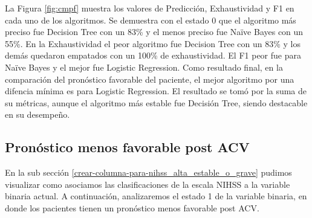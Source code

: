     La Figura \ref{fig:cmpf} muestra los valores de Predicción, Exhaustividad y F1 en cada uno de los algoritmos. Se demuestra con el estado 0 que el algoritmo más preciso fue Decision Tree con un 83\% y el menos preciso fue Naïve Bayes con un 55\%. En la Exhaustividad el peor algoritmo fue Decision Tree con un 83\% y los demás quedaron empatados con un 100\% de exhaustividad. El F1 peor fue para Naïve Bayes y el mejor fue Logistic Regression.
    Como resultado final, en la comparación del pronóstico favorable del paciente, el mejor algoritmo por una difencia mínima es para Logistic Regression. El resultado se tomó por la suma de su métricas, aunque el algoritmo más estable fue Decisión Tree, siendo destacable en su desempeño.

    \hypertarget{pronuxf3stico-menos-favorable-post-acv}{%
\subsection{Pronóstico menos favorable post ACV}\label{pronuxf3stico-menos-favorable-post-acv}}

	En la sub sección \ref{crear-columna-para-nihss_alta_estable_o_grave} pudimos visualizar como asociamos las clasificaciones de la escala NIHSS a la variable binaria actual. A continuación, analizaremos el estado 1 de la variable binaria, en donde los pacientes tienen un pronóstico menos favorable post ACV.

